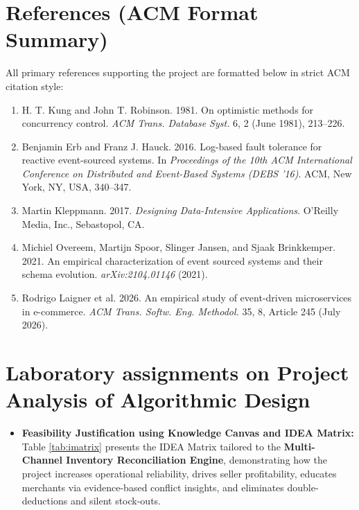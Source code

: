 \documentclass[oneside,a4paper,12pt]{report}
\begin{document}
\begin{appendices}

\chapter{References (ACM Format Summary)}
All primary references supporting the project are formatted below in strict ACM citation style:
\begin{enumerate}
  \item H. T. Kung and John T. Robinson. 1981. On optimistic methods for concurrency control. \textit{ACM Trans. Database Syst.} 6, 2 (June 1981), 213--226.
  \item Benjamin Erb and Franz J. Hauck. 2016. Log-based fault tolerance for reactive event-sourced systems. In \textit{Proceedings of the 10th ACM International Conference on Distributed and Event-Based Systems (DEBS '16)}. ACM, New York, NY, USA, 340--347.
  \item Martin Kleppmann. 2017. \textit{Designing Data-Intensive Applications}. O'Reilly Media, Inc., Sebastopol, CA.
  \item Michiel Overeem, Martijn Spoor, Slinger Jansen, and Sjaak Brinkkemper. 2021. An empirical characterization of event sourced systems and their schema evolution. \textit{arXiv:2104.01146} (2021).
  \item Rodrigo Laigner et al. 2026. An empirical study of event-driven microservices in e-commerce. \textit{ACM Trans. Softw. Eng. Methodol.} 35, 8, Article 245 (July 2026).
\end{enumerate}

\chapter{Laboratory assignments on Project Analysis of Algorithmic Design}
\begin{itemize}
  \item \textbf{Feasibility Justification using Knowledge Canvas and IDEA Matrix:}
  Table \ref{tab:imatrix} presents the IDEA Matrix \cite{innovationbook} tailored to the \textbf{Multi-Channel Inventory Reconciliation Engine}, demonstrating how the project increases operational reliability, drives seller profitability, educates merchants via evidence-based conflict insights, and eliminates double-deductions and silent stock-outs.


\end{itemize}
\end{appendices}
\end{document}
